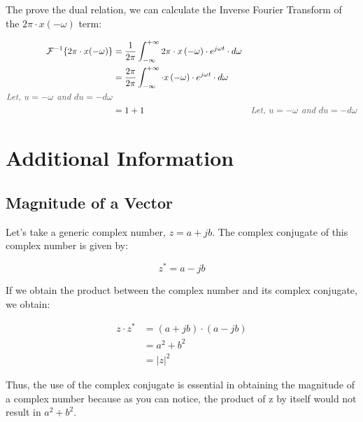 \documentclass[letterpaper,12pt]{article}
\newcommand{\annot}[1]{\textcolor{darkgray}{\textit{#1}}}
\begin{document}
The prove the dual relation, we can calculate the Inverse Fourier Transform of
the $2\pi\cdot x(-\omega)$ term:

\begin{equation*}
    \begin{aligned}
        \mathcal{F}^{-1}\{2\pi\cdot x(-\omega)\} & = \frac{1}{2\pi}\int_{-\infty}^{+\infty}2\pi\cdot x\left(-\omega\right)\cdot e^{j\omega t}\cdot d\omega                                                \\
                                                 & = \frac{2\pi}{2\pi}\int_{-\infty}^{+\infty}\cdot x\left(-\omega\right)\cdot e^{j\omega t}\cdot d\omega                                                 \\
        \annot{Let, $u = -\omega$ and $du=-d\omega$}                                                                                                                                                      \\
                                                 & = 1+ 1                                                                                                  & \annot{Let, $u = -\omega$ and $du=-d\omega$}
    \end{aligned}
\end{equation*}

\newpage
\section{Additional Information}
\subsection{Magnitude of a Vector}\label{sec:magnitude_vector}

Let's take a generic complex number, $z = a + jb$. The complex conjugate of
this complex number is given by:

\[z^{*} = a - jb\]

If we obtain the product between the complex number and its complex conjugate,
we obtain:

\begin{align*}
    z\cdot z^{*} & = (a + jb)\cdot (a - jb) \\
                 & = a^2 + b^2              \\
                 & = |z|^2
    \label{eq:complex_conjugate}
\end{align*}

Thus, the use of the complex conjugate is essential in obtaining the magnitude
of a complex number because as you can notice, the product of z by itself would
not result in $a^2 + b^2$.
\end{document}
